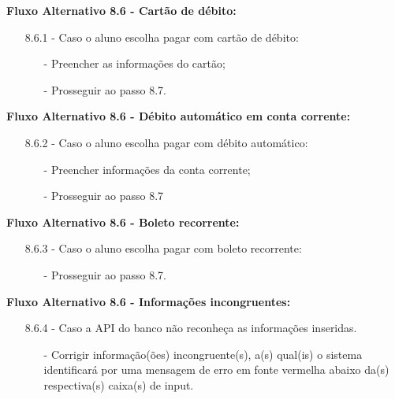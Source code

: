 \documentclass{article}
\begin{document}
    \textbf{Fluxo Alternativo 8.6 - Cartão de débito:}

    \begin{itemize}
        \item[8.6.1 -] Caso o aluno escolha pagar com cartão de débito:
        \begin{itemize}
            \item[-] Preencher as informações do cartão;
            \item[-] Prosseguir ao passo 8.7.
        \end{itemize}
    \end{itemize}

    \textbf{Fluxo Alternativo 8.6 - Débito automático em conta corrente:}

    \begin{itemize}
        \item[8.6.2 -] Caso o aluno escolha pagar com débito automático:
        \begin{itemize}
            \item[-] Preencher informações da conta corrente;
            \item[-] Prosseguir ao passo 8.7
        \end{itemize}
    \end{itemize}

    \textbf{Fluxo Alternativo 8.6 - Boleto recorrente:}

    \begin{itemize}
        \item[8.6.3 -] Caso o aluno escolha pagar com boleto recorrente:
        \begin{itemize}
            \item[-] Prosseguir ao passo 8.7.
        \end{itemize}
    \end{itemize}

    \textbf{Fluxo Alternativo 8.6 - Informações incongruentes:}

    \begin{itemize}
        \item[8.6.4 -] Caso a API do banco não reconheça as informações inseridas.
        \begin{itemize}
            \item[-] Corrigir informação(ões) incongruente(s), a(s) qual(is) o sistema identificará por uma mensagem de erro em fonte vermelha abaixo da(s) respectiva(s) caixa(s) de input.
        \end{itemize}
    \end{itemize}
\end{document}
